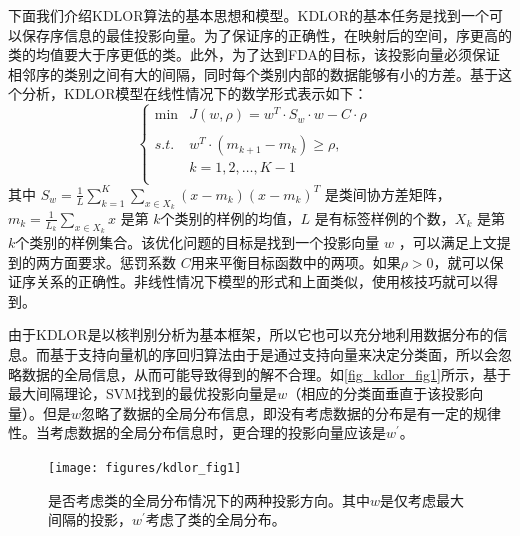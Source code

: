 下面我们介绍KDLOR算法的基本思想和模型。KDLOR的基本任务是找到一个可以保存序信息的最佳投影向量。为了保证序的正确性，在映射后的空间，序更高的类的均值要大于序更低的类。此外，为了达到FDA的目标，该投影向量必须保证相邻序的类别之间有大的间隔，同时每个类别内部的数据能够有小的方差。基于这个分析，KDLOR模型在线性情况下的数学形式表示如下：
\begin{equation}
\label{kdlor}
\left\{\begin{array}{rll} \min & J(w,\rho)=w^{T}\cdot S_{w}\cdot w-C\cdot \rho& \\
\\
s.t. & w^{T}\cdot (m_{k+1}-m_{k})\geq\rho,{} \\
     & k = 1,2,\dots,K-1\\
\end{array}
\right.
\end{equation}
其中 \(S_{w} = \frac{1}{L}\sum_{k=1}^{K}\sum_{x\in X_{k}}(x-m_{k})(x-m_{k})^{T}\) 是类间协方差矩阵，\(m_{k}=\frac{1}{L_{k}}\sum_{x\in X_{k}}x\) 是第 \(k\)个类别的样例的均值，\(L\) 是有标签样例的个数，\(X_{k}\) 是第\(k\)个类别的样例集合。该优化问题的目标是找到一个投影向量 \(w\) ，可以满足上文提到的两方面要求。惩罚系数 \(C\)用来平衡目标函数中的两项。如果\(\rho>0\)，就可以保证序关系的正确性。非线性情况下模型的形式和上面类似，使用核技巧就可以得到。

由于KDLOR是以核判别分析为基本框架，所以它也可以充分地利用数据分布的信息。而基于支持向量机的序回归算法由于是通过支持向量来决定分类面，所以会忽略数据的全局信息，从而可能导致得到的解不合理\citep{sun2010kernel}。如\autoref{fig_kdlor_fig1}所示，基于最大间隔理论，SVM找到的最优投影向量是\(w\)（相应的分类面垂直于该投影向量）。但是\(w\)忽略了数据的全局分布信息，即没有考虑数据的分布是有一定的规律性。当考虑数据的全局分布信息时，更合理的投影向量应该是\(w^{'}\)。


\begin{figure}[htb]
   \centering
   \texttt{[image: figures/kdlor\_fig1]}
\caption{是否考虑类的全局分布情况下的两种投影方向\citep{sun2010kernel}。其中$w$是仅考虑最大间隔的投影，$w^{'}$考虑了类的全局分布。}
\label{fig_kdlor_fig1}
\end{figure}


